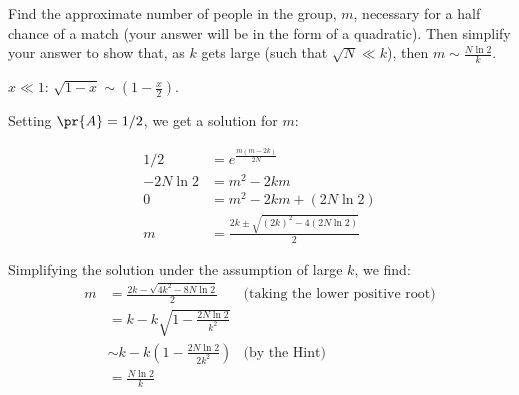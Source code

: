 \begin{problem}
\ppart Find the approximate number of people in the group, $m$,
necessary for a half chance of a match (your answer will be in the
form of a quadratic). Then simplify your answer to show that, as $k$
gets large (such that $\sqrt{N} \ll k$), then $m \sim
\frac{N\ln2}{k}$.

\hint $x \ll 1$: $\sqrt{1-x} \sim (1-\frac{x}{2})$.

\begin{solution}

Setting $\pr{A} = 1/2$, we get a solution for $m$:

\begin{align*}
1/2 &= e^{\frac{m(m-2k)}{2N}} \\
-2N\ln2 &= m^2 -2km  \\
0 &= m^2-2km + (2N\ln2) \\
m &= \frac{2k \pm \sqrt{(2k)^2 - 4(2N\ln2)}}{2}
\end{align*}

Simplifying the solution under the assumption of large $k$, we find:
\begin{align*}
m &= \frac{2k - \sqrt{4k^2 - 8N\ln2}}{2} & \text{(taking the lower positive root)} \\
&= k - k\sqrt{1 - \frac{2N\ln2}{k^2}} \\
&\sim k  - k \left(1-\frac{2N\ln2}{2k^2}\right) & \text{(by the Hint)} \\
&= \frac{N\ln2}{k}
\end{align*}

\end{solution}

\eparts

\end{problem}


